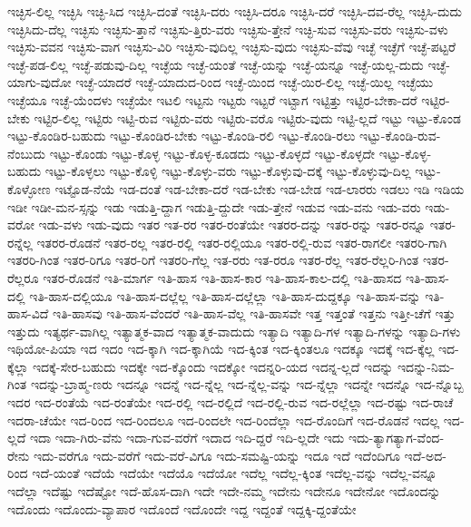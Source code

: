 {ಇಚ್ಛಿಸ-ಲಿಲ್ಲ
ಇಚ್ಛಿಸಿ
ಇಚ್ಛಿ-ಸಿದ
ಇಚ್ಛಿಸಿ-ದಂತೆ
ಇಚ್ಛಿಸಿ-ದರು
ಇಚ್ಛಿಸಿ-ದರೂ
ಇಚ್ಛಿಸಿ-ದರೆ
ಇಚ್ಛಿಸಿ-ದವ-ರೆಲ್ಲ
ಇಚ್ಛಿಸಿ-ದುದು
ಇಚ್ಛಿಸಿದು-ದೆಲ್ಲ
ಇಚ್ಛಿಸು
ಇಚ್ಛಿಸು-ತ್ತಾನೆ
ಇಚ್ಛಿಸು-ತ್ತಿರು-ವರು
ಇಚ್ಛಿಸು-ತ್ತೇನೆ
ಇಚ್ಛಿ-ಸುವ
ಇಚ್ಛಿಸು-ವರು
ಇಚ್ಛಿಸು-ವಳು
ಇಚ್ಛಿಸು-ವವನ
ಇಚ್ಛಿಸು-ವಾಗ
ಇಚ್ಛಿಸು-ವಿರಿ
ಇಚ್ಛಿಸು-ವುದಿಲ್ಲ
ಇಚ್ಛಿಸು-ವುದು
ಇಚ್ಛಿಸು-ವೆವು
ಇಚ್ಛೆ
ಇಚ್ಛೆಗೆ
ಇಚ್ಛೆ-ಪಟ್ಟರೆ
ಇಚ್ಛೆ-ಪಡ-ಲಿಲ್ಲ
ಇಚ್ಛೆ-ಪಡುವು-ದಿಲ್ಲ
ಇಚ್ಛೆಯ
ಇಚ್ಛೆ-ಯಂತೆ
ಇಚ್ಛೆ-ಯನ್ನು
ಇಚ್ಛೆ-ಯನ್ನೂ
ಇಚ್ಛೆ-ಯಲ್ಲ-ದುದು
ಇಚ್ಛೆ-ಯಾಗು-ವುದೋ
ಇಚ್ಛೆ-ಯಾದರೆ
ಇಚ್ಛೆ-ಯಾದುದ-ರಿಂದ
ಇಚ್ಛೆ-ಯಿಂದ
ಇಚ್ಛೆ-ಯಿರ-ಲಿಲ್ಲ
ಇಚ್ಛೆ-ಯಿಲ್ಲ
ಇಚ್ಛೆಯು
ಇಚ್ಛೆಯೂ
ಇಚ್ಛೆ-ಯೆಂದಳು
ಇಚ್ಛೆಯೇ
ಇಟಲಿ
ಇಟ್ಟನು
ಇಟ್ಟರು
ಇಟ್ಟರೆ
ಇಟ್ಟಾಗ
ಇಟ್ಟಿತ್ತು
ಇಟ್ಟಿರ-ಬೇಕಾ-ದರೆ
ಇಟ್ಟಿರ-ಬೇಕು
ಇಟ್ಟಿರ-ಲಿಲ್ಲ
ಇಟ್ಟಿರು
ಇಟ್ಟಿ-ರುವ
ಇಟ್ಟಿರು-ವರು
ಇಟ್ಟಿರು-ವರೊ
ಇಟ್ಟಿರು-ವುದು
ಇಟ್ಟಿ-ಲ್ಲದೆ
ಇಟ್ಟು
ಇಟ್ಟು-ಕೊಂಡ
ಇಟ್ಟು-ಕೊಂಡಿರ-ಬಹುದು
ಇಟ್ಟು-ಕೊಂಡಿರ-ಬೇಕು
ಇಟ್ಟು-ಕೊಂಡಿ-ರಲಿ
ಇಟ್ಟು-ಕೊಂಡಿ-ರಲು
ಇಟ್ಟು-ಕೊಂಡಿ-ರುವ-ನೆಂಬುದು
ಇಟ್ಟು-ಕೊಂಡು
ಇಟ್ಟು-ಕೊಳ್ಳ
ಇಟ್ಟು-ಕೊಳ್ಳ-ಕೂಡದು
ಇಟ್ಟು-ಕೊಳ್ಳದೆ
ಇಟ್ಟು-ಕೊಳ್ಳದೇ
ಇಟ್ಟು-ಕೊಳ್ಳ-ಬಹುದು
ಇಟ್ಟು-ಕೊಳ್ಳಲು
ಇಟ್ಟು-ಕೊಳ್ಳಿ
ಇಟ್ಟು-ಕೊಳ್ಳು-ವರು
ಇಟ್ಟು-ಕೊಳ್ಳುವು-ದಕ್ಕೆ
ಇಟ್ಟು-ಕೊಳ್ಳುವು-ದಿಲ್ಲ
ಇಟ್ಟು-ಕೊಳ್ಳೋಣ
ಇಟ್ಟೊಡ-ನೆಯೆ
ಇಡ-ದಂತೆ
ಇಡ-ಬೇಕಾ-ದರೆ
ಇಡ-ಬೇಕು
ಇಡ-ಬೇಡ
ಇಡ-ಲಾರರು
ಇಡಲು
ಇಡಿ
ಇಡಿಯ
ಇಡೀ
ಇಡೀ-ಮನ-ಸ್ಸನ್ನು
ಇಡು
ಇಡುತ್ತಿ-ದ್ದಾಗ
ಇಡುತ್ತಿ-ದ್ದುದೇ
ಇಡು-ತ್ತೇನೆ
ಇಡುವ
ಇಡು-ವನು
ಇಡು-ವರು
ಇಡು-ವರೋ
ಇಡು-ವಳು
ಇಡು-ವುದು
ಇತರ
ಇತ-ರರ
ಇತರ-ರಂತೆಯೇ
ಇತರರ-ದನ್ನು
ಇತರ-ರನ್ನು
ಇತರ-ರನ್ನೂ
ಇತರ-ರನ್ನೆಲ್ಲ
ಇತರರ-ರೊಡನೆ
ಇತರ-ರಲ್ಲ
ಇತರ-ರಲ್ಲಿ
ಇತರ-ರಲ್ಲಿಯೂ
ಇತರ-ರಲ್ಲಿ-ರುವ
ಇತರ-ರಾಗಲೀ
ಇತರರಿ-ಗಾಗಿ
ಇತರರಿ-ಗಿಂತ
ಇತರ-ರಿಗೂ
ಇತರ-ರಿಗೆ
ಇತರರಿ-ಗೆಲ್ಲ
ಇತ-ರರು
ಇತ-ರರೂ
ಇತರ-ರೆಲ್ಲ
ಇತರ-ರೆಲ್ಲರಿ-ಗಿಂತ
ಇತರ-ರೆಲ್ಲರೂ
ಇತರ-ರೊಡನೆ
ಇತಿ-ಮಾರ್ಗ
ಇತಿ-ಹಾಸ
ಇತಿ-ಹಾಸ-ಕಾರ
ಇತಿ-ಹಾಸ-ಕಾಲ-ದಲ್ಲಿ
ಇತಿ-ಹಾಸದ
ಇತಿ-ಹಾಸ-ದಲ್ಲಿ
ಇತಿ-ಹಾಸ-ದಲ್ಲಿಯೂ
ಇತಿ-ಹಾಸ-ದಲ್ಲೆಲ್ಲ
ಇತಿ-ಹಾಸ-ದಲ್ಲೆಲ್ಲಾ
ಇತಿ-ಹಾಸ-ದುದ್ದಕ್ಕೂ
ಇತಿ-ಹಾಸ-ವನ್ನು
ಇತಿ-ಹಾಸ-ವಿದೆ
ಇತಿ-ಹಾಸವು
ಇತಿ-ಹಾಸ-ವೆಂದರೆ
ಇತಿ-ಹಾಸ-ವೆಲ್ಲ
ಇತಿ-ಹಾಸವೇ
ಇತ್ತ
ಇತ್ತಂತೆ
ಇತ್ತನು
ಇತ್ತೀ-ಚೆಗೆ
ಇತ್ತು
ಇತ್ತುದು
ಇತ್ಯರ್ಥ-ವಾಗಿಲ್ಲ
ಇತ್ಯಾತ್ಮಕ-ವಾದ
ಇತ್ಯಾತ್ಮಕ-ವಾದುದು
ಇತ್ಯಾದಿ
ಇತ್ಯಾದಿ-ಗಳ
ಇತ್ಯಾದಿ-ಗಳನ್ನು
ಇತ್ಯಾದಿ-ಗಳು
ಇಥಿಯೋ-ಪಿಯಾ
ಇದ
ಇದಂ
ಇದ-ಕ್ಕಾಗಿ
ಇದ-ಕ್ಕಾಗಿಯೆ
ಇದ-ಕ್ಕಿಂತ
ಇದ-ಕ್ಕಿಂತಲೂ
ಇದಕ್ಕೂ
ಇದಕ್ಕೆ
ಇದ-ಕ್ಕೆಲ್ಲ
ಇದ-ಕ್ಕೆಲ್ಲಾ
ಇದಕ್ಕೆ-ಸೇರ-ಬಹುದು
ಇದಕ್ಕೇ
ಇದ-ಕ್ಕೊಂದು
ಇದಕ್ಕೋ
ಇದನ್ನರಿ-ಯದ
ಇದನ್ನ-ಲ್ಲದೆ
ಇದನ್ನು
ಇದನ್ನು-ನಿಮ-ಗಿಂತ
ಇದನ್ನು-ಬ್ರಾಹ್ಮ-ಣರು
ಇದನ್ನೂ
ಇದನ್ನೆ
ಇದ-ನ್ನೆಲ್ಲ
ಇದ-ನ್ನೆಲ್ಲ-ವನ್ನು
ಇದ-ನ್ನೆಲ್ಲಾ
ಇದನ್ನೇ
ಇದನ್ನೊ
ಇದ-ನ್ನೊಬ್ಬ
ಇದರ
ಇದ-ರಂತೆಯೆ
ಇದ-ರಂತೆಯೇ
ಇದ-ರಲ್ಲಿ
ಇದ-ರಲ್ಲಿದೆ
ಇದ-ರಲ್ಲಿ-ರುವ
ಇದ-ರಲ್ಲೆಲ್ಲಾ
ಇದ-ರಷ್ಟು
ಇದ-ರಾಚೆ
ಇದರಾ-ಚೆಯೇ
ಇದ-ರಿಂದ
ಇದ-ರಿಂದಲೂ
ಇದ-ರಿಂದಲೇ
ಇದ-ರಿಂದೆಲ್ಲಾ
ಇದ-ರೊಂದಿಗೆ
ಇದ-ರೊಡನೆ
ಇದಲ್ಲ
ಇದ-ಲ್ಲದೆ
ಇದಾ
ಇದಾ-ಗಿರು-ವೆನು
ಇದಾ-ಗುವ-ವರೆಗೆ
ಇದಾದ
ಇದಿ-ದ್ದರೆ
ಇದಿ-ಲ್ಲದೇ
ಇದು
ಇದು-ತ್ಯಾಗತ್ಯಾಗ-ವೆಂದ-ರೇನು
ಇದು-ವರೆಗೂ
ಇದು-ವರೆಗೆ
ಇದು-ವರೆ-ವಿಗೂ
ಇದು-ಸಮಷ್ಟಿ-ಯನ್ನು
ಇದೂ
ಇದೆ
ಇದೆಂದಿಗೂ
ಇದೆ-ಅದ-ರಿಂದ
ಇದೆ-ಯಂತೆ
ಇದೆಯೆ
ಇದೆಯೇ
ಇದೆಯೊ
ಇದೆಯೋ
ಇದೆಲ್ಲ
ಇದೆಲ್ಲ-ಕ್ಕಿಂತ
ಇದೆಲ್ಲ-ವನ್ನು
ಇದೆಲ್ಲ-ವನ್ನೂ
ಇದೆಲ್ಲಾ
ಇದೆಷ್ಟು
ಇದೆಷ್ಟೋ
ಇದೆ-ಹೊಸ-ದಾಗಿ
ಇದೇ
ಇದೇ-ನಮ್ಮ
ಇದೇನು
ಇದೇನೂ
ಇದೇನೋ
ಇದೊಂದನ್ನು
ಇದೊಂದು
ಇದೊಂದು-ವ್ಯಾಪಾರ
ಇದೊಂದೆ
ಇದೊಂದೇ
ಇದ್ದ
ಇದ್ದಂತೆ
ಇದ್ದಕ್ಕಿ-ದ್ದಂತೆಯೇ
}
